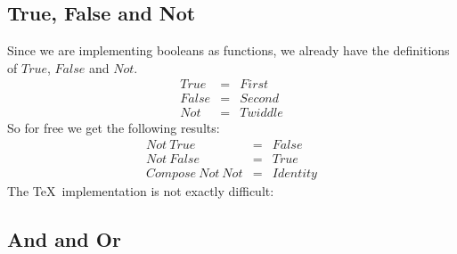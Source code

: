 \subsection{True, False and Not}

Since we are implementing booleans as functions, we already have the
definitions of $True$, $False$ and $Not$.
\begin{eqnarray*}
    True  &  =  &  First  \\
   False  &  =  &  Second  \\
     Not  &  =  &  Twiddle
\end{eqnarray*}
So for free we get the following results:
\begin{eqnarray*}
          Not~True  &  =  &  False  \\
         Not~False  &  =  &  True  \\
   Compose~Not~Not  &  =  &  Identity  
\end{eqnarray*}
The \TeX\ implementation is not exactly difficult:
\begin{TeXcode}
\let\True=\First
\let\False=\Second
\let\Not=\Twiddle
\end{TeXcode}

\subsection{And and Or}

